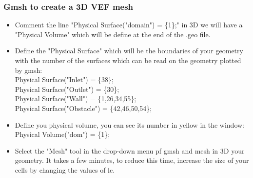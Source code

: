 \documentclass[10pt, hyperref={unicode=true,pdfusetitle, bookmarks=true,bookmarksnumbered=false,bookmarksopen=false, breaklinks=false,pdfborder={0 0 1},backref=true,colorlinks=true,linkcolor=darkblue,pageanchor}]{beamer}
\begin{document}
\begin{frame}
\frametitle{Gmsh to create a 3D VEF mesh}
\begin{block}{}

\begin{itemize}
\item Comment the line "Physical Surface("domain") = \{1\};" in 3D we will have a "Physical Volume" which will be define at the end of the .geo file.
\item Define the "Physical Surface" which will be the boundaries of your geometry with the number of the surfaces which can be read on the geometry plotted by gmsh:\\
Physical Surface("Inlet") = \{38\};\\
Physical Surface("Outlet") = \{30\};\\
Physical Surface("Wall") = \{1,26,34,55\};\\
Physical Surface("Obstacle") = \{42,46,50,54\};\\
\item Define you physical volume, you can see its number in yellow in the window:\\
Physical Volume("dom") = \{1\};


\item Select the "Mesh" tool in the drop-down menu pf gmsh and mesh in 3D your geometry. It takes a few minutes, to reduce this time, increase the size of your cells by changing the values of lc.
\end{itemize}

\end{block}
\end{frame}
\end{document}
